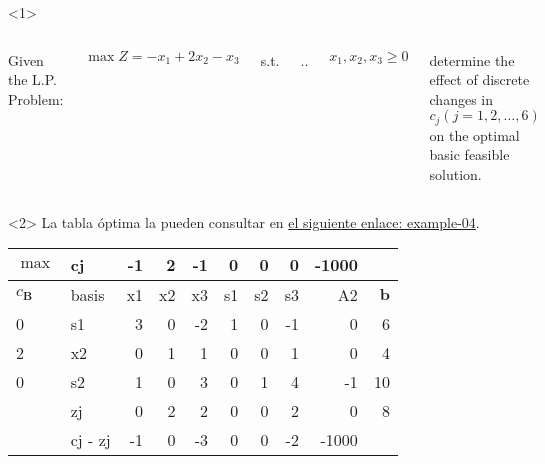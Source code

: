 \begin{frameExample}{}{}

  \begin{onlyenv}<1>
          \begin{columns}
    Given the L.P. Problem:

    $\max Z = -x_1 + 2x_2 - x_3$

    
    s.t.

    \vspace{5mm}
    \sysdelim..%

    \vspace{5mm}

    $x_1,x_2,x_3 \geq 0$

    determine the effect of discrete changes in $c_j (j = 1,2,\ldots,6)$ on the optimal basic feasible solution.
  \end{columns}
  \end{onlyenv}

  \begin{onlyenv}<2>
    La tabla óptima la pueden consultar en \href{https://docs.google.com/spreadsheets/d/1rYsOiQEihozZusyn8mMk6Czqx2KFfgoRonP8k8F_Qsk/edit?usp=sharing}{el siguiente enlace: example-04}.

\begin{table}[!ht]
    \centering
    \begin{tabular}{ll|rrrrrrr|r}
\toprule    
      $\max$ & cj & -1 & 2 & -1 & 0 & 0 & 0 & -1000 & ~ \\
      \midrule
      $c_{\boldsymbol{B}}$ & basis & x1 & x2 & x3 & s1 & s2 & s3 & A2 & $\boldsymbol{b}$ \\
      \midrule
        0 & s1 & 3 & 0 & -2 & 1 & 0 & -1 & 0 & 6 \\ 
      2 & x2 & 0 & 1 & 1 & 0 & 0 & 1 & 0 & 4 \\
      0 & s2 & 1 & 0 & 3 & 0 & 1 & 4 & -1 & 10 \\
            \midrule
        ~ & zj & 0 & 2 & 2 & 0 & 0 & 2 & 0 & 8 \\ 
      ~ & cj - zj & -1 & 0 & -3 & 0 & 0 & -2 & -1000 \\
      \bottomrule
    \end{tabular}
\end{table}
  \end{onlyenv}
\end{frameExample}

